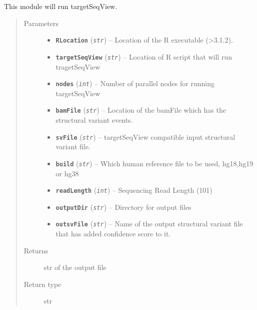 \documentclass[letterpaper,10pt,english]{sphinxmanual}
\begin{document}
\begin{fulllineitems}
\label{iCallSV:iCallSV.Run_targetSeqView.run}
This module will run targetSeqView.
\begin{quote}\begin{description}
\item[{Parameters}] \leavevmode\begin{itemize}
\item {} 
\textbf{\texttt{RLocation}} (\emph{\texttt{str}}) -- Location of the R executable (\textgreater{}3.1.2).

\item {} 
\textbf{\texttt{targetSeqView}} (\emph{\texttt{str}}) -- Location of R script that will run tragetSeqView

\item {} 
\textbf{\texttt{nodes}} (\emph{\texttt{int}}) -- Number of parallel nodes for running targetSeqView

\item {} 
\textbf{\texttt{bamFile}} (\emph{\texttt{str}}) -- Location of the bamFile which has the  structural variant events.

\item {} 
\textbf{\texttt{svFile}} (\emph{\texttt{str}}) -- targetSeqView compatible input structural variant file.

\item {} 
\textbf{\texttt{build}} (\emph{\texttt{str}}) -- Which human reference file to be used, hg18,hg19 or hg38

\item {} 
\textbf{\texttt{readLength}} (\emph{\texttt{int}}) -- Sequencing Read Length (101)

\item {} 
\textbf{\texttt{outputDir}} (\emph{\texttt{str}}) -- Directory for output files

\item {} 
\textbf{\texttt{outsvFile}} (\emph{\texttt{str}}) -- Name of the output structural variant file that has added confidence score to it.

\end{itemize}

\item[{Returns}] \leavevmode
str of the output file

\item[{Return type}] \leavevmode
str

\end{description}\end{quote}

\end{fulllineitems}
\end{document}
